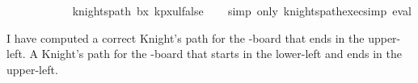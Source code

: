 \begin{isabellebody}
\ \ {\isacharbrackleft}{\kern0pt}{}{}{\isacharcomma}{\kern0pt}{}{}{\isacharcomma}{\kern0pt}{}{}{\isacharcomma}{\kern0pt}{}{}{\isacharcomma}{\kern0pt}{}{}{\isacharcomma}{\kern0pt}{}{}{\isacharbrackright}{\kern0pt}{\isacharcomma}{\kern0pt}\isanewline
\ \ {\isacharbrackleft}{\kern0pt}{}{}{\isacharcomma}{\kern0pt}{}{\isacharcomma}{\kern0pt}{}{}{\isacharcomma}{\kern0pt}{}{}{\isacharcomma}{\kern0pt}{}{}{\isacharcomma}{\kern0pt}{}{\isacharbrackright}{\kern0pt}{\isacharcomma}{\kern0pt}\isanewline
\ \ {\isacharbrackleft}{\kern0pt}{}{}{\isacharcomma}{\kern0pt}{}{}{\isacharcomma}{\kern0pt}{}{\isacharcomma}{\kern0pt}{}{}{\isacharcomma}{\kern0pt}{}{}{\isacharcomma}{\kern0pt}{}{}{\isacharbrackright}{\kern0pt}{\isacharcomma}{\kern0pt}\isanewline
\ \ {\isacharbrackleft}{\kern0pt}{}{\isacharcomma}{\kern0pt}{}{}{\isacharcomma}{\kern0pt}{}{\isacharcomma}{\kern0pt}{}{}{\isacharcomma}{\kern0pt}{}{\isacharcomma}{\kern0pt}{}{}{\isacharbrackright}{\kern0pt}{\isacharbrackright}{\kern0pt}{\isacharparenright}{\kern0pt}{\isachardoublequoteclose}\isanewline
\isanewline
{}\isamarkupfalse%
\ {\isachardoublequoteopen}{\isasymnot}knights{\isacharunderscore}{\kern0pt}path\ b{}x{}\ kp{}x{}ul{\isacharunderscore}{\kern0pt}false{\isachardoublequoteclose}\isanewline
%
\isadelimproof
\ \ %
\endisadelimproof
%
\isatagproof
{}\isamarkupfalse%
\ {\isacharparenleft}{\kern0pt}simp\ only{\isacharcolon}{\kern0pt}\ knights{\isacharunderscore}{\kern0pt}path{\isacharunderscore}{\kern0pt}exec{\isacharunderscore}{\kern0pt}simp{\isacharparenright}{\kern0pt}\ eval%
\endisatagproof
{\isafoldproof}%
%
\isadelimproof
%
\endisadelimproof
%
\begin{isamarkuptext}%
I have computed a correct Knight's path for the -board that ends in the upper-left.
A Knight's path for the -board that starts in the lower-left and ends in the upper-left.
  \begin{table}[H]

\end{table}
\end{isamarkuptext}
\end{isabellebody}
